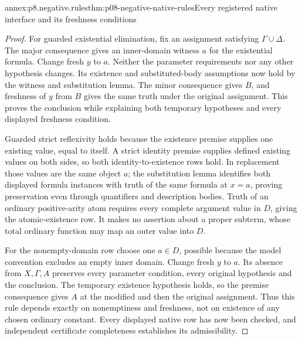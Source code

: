 \begin{annexitem}{annex:p8.negative.rules}{thm:p08-negative-native-rules}{Every registered native interface and its freshness conditions}
\begin{proof}
For guarded existential elimination, fix an assignment satisfying
\(\Gamma\cup\Delta\).  The major consequence gives an inner-domain
witness \(a\) for the existential formula.  Change fresh \(y\) to
\(a\).  Neither the parameter requirements nor any other hypothesis
changes.  Its existence and substituted-body assumptions now hold by
the witness and substitution lemma.  The minor consequence gives
\(B\), and freshness of \(y\) from \(B\) gives the same truth under
the original assignment.  This proves the conclusion while explaining
both temporary hypotheses and every displayed freshness condition.

Guarded strict reflexivity holds because the existence premise supplies
one existing value, equal to itself.  A strict identity premise supplies
defined existing values on both sides, so both identity-to-existence
rows hold.  In replacement those values are the same object \(a\);
the substitution lemma identifies both displayed formula instances
with truth of the same formula at \(x=a\), proving preservation even
through quantifiers and description bodies.  Truth of an ordinary
positive-arity atom requires every complete argument value in \(D\),
giving the atomic-existence row.  It makes no assertion about a proper
subterm, whose total ordinary function may map an outer value into \(D\).

For the nonempty-domain row choose one \(a\in D\), possible because
the model convention excludes an empty inner domain.  Change fresh
\(y\) to \(a\).  Its absence from \(X,\Gamma,A\) preserves every
parameter condition, every original hypothesis and the conclusion.
The temporary existence hypothesis holds, so the premise consequence
gives \(A\) at the modified and then the original assignment.
Thus this rule depends exactly on nonemptiness and freshness, not on
existence of any chosen ordinary constant.  Every displayed native
row has now been checked, and independent certificate completeness
establishes its admissibility.
\end{proof}
\end{annexitem}


